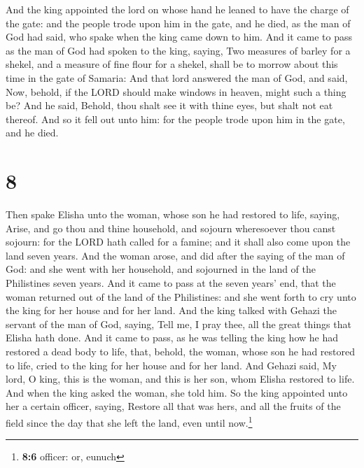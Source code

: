  And the king appointed the lord on whose hand he leaned
to have the charge of the gate: and the people trode upon him in the
gate, and he died, as the man of God had said, who spake when the king
came down to him.  And it came to pass as the man of God
had spoken to the king, saying, Two measures of barley for a shekel, and
a measure of fine flour for a shekel, shall be to morrow about this time
in the gate of Samaria:  And that lord answered the man
of God, and said, Now, behold, if the LORD should make windows in
heaven, might such a thing be? And he said, Behold, thou shalt see it
with thine eyes, but shalt not eat thereof.  And so it
fell out unto him: for the people trode upon him in the gate, and he
died.

\hypertarget{section-7}{%
\section{8}\label{section-7}}

 Then spake Elisha unto the woman, whose son he had
restored to life, saying, Arise, and go thou and thine household, and
sojourn wheresoever thou canst sojourn: for the LORD hath called for a
famine; and it shall also come upon the land seven years. 
And the woman arose, and did after the saying of the man of God: and she
went with her household, and sojourned in the land of the Philistines
seven years.  And it came to pass at the seven years' end,
that the woman returned out of the land of the Philistines: and she went
forth to cry unto the king for her house and for her land.
 And the king talked with Gehazi the servant of the man of
God, saying, Tell me, I pray thee, all the great things that Elisha hath
done.  And it came to pass, as he was telling the king how
he had restored a dead body to life, that, behold, the woman, whose son
he had restored to life, cried to the king for her house and for her
land. And Gehazi said, My lord, O king, this is the woman, and this is
her son, whom Elisha restored to life.  And when the king
asked the woman, she told him. So the king appointed unto her a certain
officer, saying, Restore all that was hers, and all the fruits of the
field since the day that she left the land, even until now.\footnote{\textbf{8:6}
  officer: or, eunuch}

